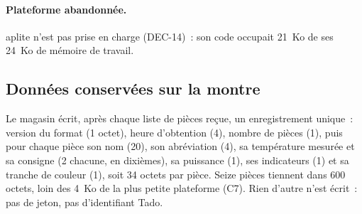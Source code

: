 \paragraph{Plateforme abandonnée.} aplite n'est pas prise en charge (DEC-14)~: son code occupait 21~Ko de ses
24~Ko de mémoire de travail.

\subsection{Données conservées sur la montre}

Le magasin écrit, après chaque liste de pièces reçue, un enregistrement unique~:
version du format (1 octet), heure d'obtention (4), nombre de pièces (1), puis pour chaque pièce son
nom (20), son abréviation (4), sa température mesurée et sa consigne (2 chacune, en dixièmes), sa
puissance (1), ses indicateurs (1) et sa tranche de couleur (1), soit 34 octets par pièce. Seize
pièces tiennent dans 600 octets, loin des 4~Ko de la plus petite plateforme (C7). Rien d'autre
n'est écrit~: pas de jeton, pas d'identifiant Tado.
